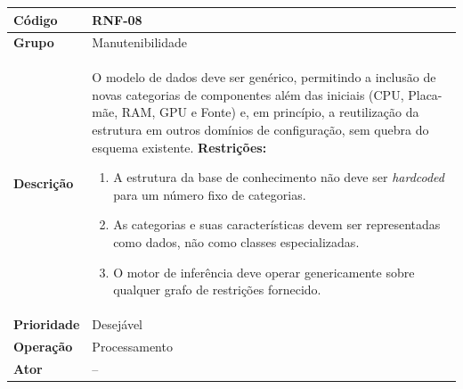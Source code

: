 \FloatBarrier
\begin{quadro}[htb]
  \caption{RNF-08 -- Base de conhecimento genérica e reutilizável}
  \label{quad:rnf08}
  \begin{tabular}{|p{3.2cm}|p{11.8cm}|}
    \hline
    \textbf{Código}     & RNF-08                                                                                     \\ \hline
    \textbf{Grupo}      & Manutenibilidade                                                                           \\ \hline
    \textbf{Descrição}  &
    O modelo de dados deve ser genérico, permitindo a inclusão de novas categorias de componentes além das iniciais (CPU, Placa-mãe, RAM, GPU e Fonte) e, em princípio, a reutilização da estrutura em outros domínios de configuração, sem quebra do esquema existente.
    \textbf{Restrições:}
    \begin{enumerate}[nosep,leftmargin=1.2em,topsep=2pt,partopsep=0pt,parsep=0pt,itemsep=1pt]
      \item A estrutura da base de conhecimento não deve ser \textit{hardcoded} para um número fixo de categorias.
      \item As categorias e suas características devem ser representadas como dados, não como classes especializadas.
      \item O motor de inferência deve operar genericamente sobre qualquer grafo de restrições fornecido.
    \end{enumerate} \\ \hline
    \textbf{Prioridade} & Desejável                                                                                  \\ \hline
    \textbf{Operação}   & Processamento                                                                              \\ \hline
    \textbf{Ator}       & --                                                                                         \\ \hline
  \end{tabular}
\end{quadro}

